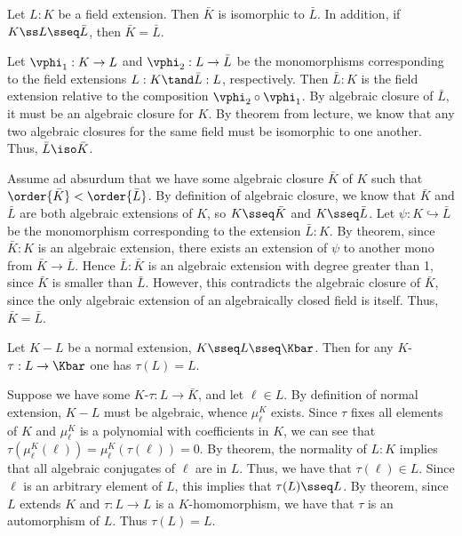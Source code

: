 \documentclass{article}
\begin{document}
\begin{exercise} %
  Let $ L:K $ be a field extension. Then $ \bar K $ is isomorphic to $ \bar L $.
  In addition, if $ K\ss L \sseq \bar L $, then $ \bar K = \bar L $.
\end{exercise}
\begin{solution}
  Let $ \vphi_1:K\to L $ and $ \vphi_2:L\to \bar L $ be the monomorphisms corresponding to the field extensions $ L:K \tand \bar L:L$, respectively.
  Then $ \bar L:K $ is the field extension relative to the composition $ \vphi_2\circ \vphi_1 $.
  By algebraic closure of $ \bar L $, it must be an algebraic closure for $ K $.
  By theorem from lecture, we know that any two algebraic closures for the same field must be isomorphic to one another.
  Thus, $ \bar L\iso \bar K $.

  Assume ad absurdum that we have some algebraic closure $ \bar K $ of $ K $ such that $ \order{\bar K} < \order{\bar L}$.
  By definition of algebraic closure, we know that $ \bar K $ and $ \bar L $ are both algebraic extensions of $ K $, so $ K\sseq \bar K $ and $ K\sseq \bar L $.
  Let $ \psi:K\hookrightarrow\bar L $ be the monomorphism corresponding to the extension $ \bar L:K $.
  By theorem, since $ \bar K:K $ is an algebraic extension, there exists an extension of $ \psi $ to another mono from $ \bar K \to \bar L $.
  Hence $ \bar L:\bar K $ is an algebraic extension with degree greater than 1, since $ \bar K $ is smaller than $ \bar L $.
  However, this contradicts the algebraic closure of $ \bar K $, since the only algebraic extension of an algebraically closed field is itself.
  Thus, $ \bar K = \bar L $.
\end{solution}

\begin{exercise} %
  Let $ K-L $ be a normal extension, $ K\sseq L\sseq \Kbar $.
  Then for any $ K $-\homo $ \tau:L\to \Kbar $ one has $ \tau(L) = L $.
\end{exercise}
\begin{solution}
  Suppose we have some $ K $-\homo $ \tau:L\to\bar K $, and let $ \ell\in L $.
  By definition of normal extension, $ K-L $ must be algebraic, whence $ \mu_\ell^K $ exists.
  Since $ \tau $ fixes all elements of $ K $ and $ \mu_\ell^K $ is a polynomial with coefficients in $ K $, we can see that $ \tau(\mu_\ell^K(\ell)) = \mu_\ell^K(\tau(\ell)) = 0 $.
  By theorem, the normality of $ L:K $ implies that all algebraic conjugates of $ \ell $ are in $ L $.
  Thus, we have that $ \tau(\ell)\in L $.
  Since $ \ell $ is an arbitrary element of $ L $, this implies that $ \tau(L) \sseq L $.
  By theorem, since $ L $ extends $ K $ and $ \tau:L\to L $ is a $ K $-homomorphism, we have that $ \tau $ is an automorphism of $ L $.
  Thus $ \tau(L) = L $.
\end{solution}
\end{document}
